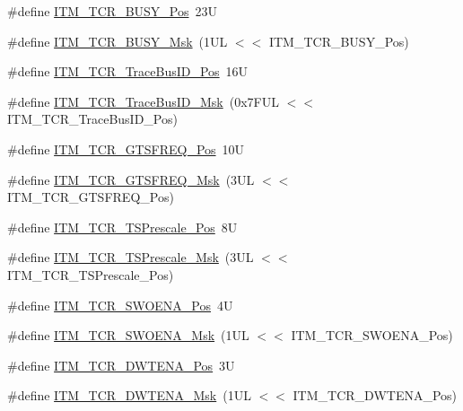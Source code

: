 \begin{DoxyCompactItemize}
\item 
\#define \hyperlink{group___c_m_s_i_s___i_t_m_ga9174ad4a36052c377cef4e6aba2ed484}{I\-T\-M\-\_\-\-T\-C\-R\-\_\-\-B\-U\-S\-Y\-\_\-\-Pos}~23\-U
\item 
\#define \hyperlink{group___c_m_s_i_s___i_t_m_ga43ad7cf33de12f2ef3a412d4f354c60f}{I\-T\-M\-\_\-\-T\-C\-R\-\_\-\-B\-U\-S\-Y\-\_\-\-Msk}~(1\-U\-L $<$$<$ I\-T\-M\-\_\-\-T\-C\-R\-\_\-\-B\-U\-S\-Y\-\_\-\-Pos)
\item 
\#define \hyperlink{group___c_m_s_i_s___i_t_m_gaca0281de867f33114aac0636f7ce65d3}{I\-T\-M\-\_\-\-T\-C\-R\-\_\-\-Trace\-Bus\-I\-D\-\_\-\-Pos}~16\-U
\item 
\#define \hyperlink{group___c_m_s_i_s___i_t_m_ga60c20bd9649d1da5a2be8e656ba19a60}{I\-T\-M\-\_\-\-T\-C\-R\-\_\-\-Trace\-Bus\-I\-D\-\_\-\-Msk}~(0x7\-F\-U\-L $<$$<$ I\-T\-M\-\_\-\-T\-C\-R\-\_\-\-Trace\-Bus\-I\-D\-\_\-\-Pos)
\item 
\#define \hyperlink{group___c_m_s_i_s___i_t_m_ga96c7c7cbc0d98426c408090b41f583f1}{I\-T\-M\-\_\-\-T\-C\-R\-\_\-\-G\-T\-S\-F\-R\-E\-Q\-\_\-\-Pos}~10\-U
\item 
\#define \hyperlink{group___c_m_s_i_s___i_t_m_gade862cf009827f7f6748fc44c541b067}{I\-T\-M\-\_\-\-T\-C\-R\-\_\-\-G\-T\-S\-F\-R\-E\-Q\-\_\-\-Msk}~(3\-U\-L $<$$<$ I\-T\-M\-\_\-\-T\-C\-R\-\_\-\-G\-T\-S\-F\-R\-E\-Q\-\_\-\-Pos)
\item 
\#define \hyperlink{group___c_m_s_i_s___i_t_m_gad7bc9ee1732032c6e0de035f0978e473}{I\-T\-M\-\_\-\-T\-C\-R\-\_\-\-T\-S\-Prescale\-\_\-\-Pos}~8\-U
\item 
\#define \hyperlink{group___c_m_s_i_s___i_t_m_ga7a723f71bfb0204c264d8dbe8cc7ae52}{I\-T\-M\-\_\-\-T\-C\-R\-\_\-\-T\-S\-Prescale\-\_\-\-Msk}~(3\-U\-L $<$$<$ I\-T\-M\-\_\-\-T\-C\-R\-\_\-\-T\-S\-Prescale\-\_\-\-Pos)
\item 
\#define \hyperlink{group___c_m_s_i_s___i_t_m_ga7a380f0c8078f6560051406583ecd6a5}{I\-T\-M\-\_\-\-T\-C\-R\-\_\-\-S\-W\-O\-E\-N\-A\-\_\-\-Pos}~4\-U
\item 
\#define \hyperlink{group___c_m_s_i_s___i_t_m_ga97476cb65bab16a328b35f81fd02010a}{I\-T\-M\-\_\-\-T\-C\-R\-\_\-\-S\-W\-O\-E\-N\-A\-\_\-\-Msk}~(1\-U\-L $<$$<$ I\-T\-M\-\_\-\-T\-C\-R\-\_\-\-S\-W\-O\-E\-N\-A\-\_\-\-Pos)
\item 
\#define \hyperlink{group___c_m_s_i_s___i_t_m_ga30e83ebb33aa766070fe3d1f27ae820e}{I\-T\-M\-\_\-\-T\-C\-R\-\_\-\-D\-W\-T\-E\-N\-A\-\_\-\-Pos}~3\-U
\item 
\#define \hyperlink{group___c_m_s_i_s___i_t_m_ga98ea1c596d43d3633a202f9ee746cf70}{I\-T\-M\-\_\-\-T\-C\-R\-\_\-\-D\-W\-T\-E\-N\-A\-\_\-\-Msk}~(1\-U\-L $<$$<$ I\-T\-M\-\_\-\-T\-C\-R\-\_\-\-D\-W\-T\-E\-N\-A\-\_\-\-Pos)

\end{DoxyCompactItemize}
